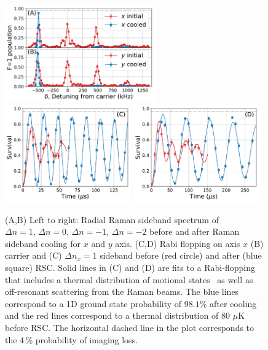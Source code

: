 \documentclass[aps,prl,twocolumn,groupedaddress]{revtex4-1}
\begin{document}
\begin{figure}
  \includegraphics[height=4.2cm]{spectrum_r.pdf}
  \includegraphics[height=4.2cm]{rabi_flop_rx_0.pdf}
  \includegraphics[height=4.2cm]{rabi_flop_rx_p1.pdf}
  \caption{(A,B) Left to right: Radial Raman sideband spectrum of $\Delta n=1,\,\Delta n=0,\,\Delta n=-1,\,\Delta n=-2$ before and after Raman sideband cooling for $x$ and $y$ axis.
    (C,D) Rabi flopping on axis $x$ (B) carrier and (C) $\Delta n_x=1$ sideband
    before (red circle) and after (blue square) RSC.
    Solid lines in (C) and (D) are fits to a Rabi-flopping
    that includes a thermal distribution of motional states~\cite{Meekhof1996}
    as well as off-resonant scattering from the Raman beams.
    The blue lines correspond to a 1D ground state probability of $98.1$\% after cooling
    and the red lines correspond to a thermal distribution of $80$ $\mu$K before RSC.
    The horizontal dashed line in the plot corresponds to the $4\,\%$ probability
    of imaging loss.
    \label{f-radial}}
\end{figure}
\end{document}
